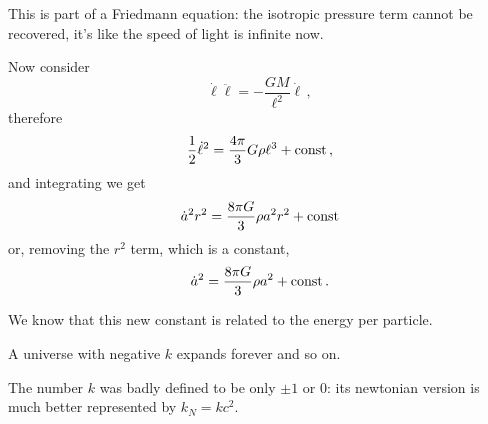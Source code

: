 \documentclass[main.tex]{subfiles}
\begin{document}
This is part of a Friedmann equation: the isotropic pressure term cannot be recovered, it's like the speed of light is infinite now.

Now consider 
\begin{equation}
  \dot{\ell} \ddot{\ell} = - \frac{GM}{\ell^2} \dot{\ell}\,,
\end{equation}
%
therefore 
%
\begin{equation}
  \frac{1}{2}\dot{\ell}^2 = \frac{4 \pi}{3} G \rho \ell^{3} + \text{const}\,,
\end{equation}
%
and integrating we get
%
\begin{equation}
  \dot{a}^2 r^2 = \frac{8 \pi G}{3} \rho a^2 r^2 + \text{const}
\end{equation}
%
or, removing the \(r^2\) term, which is a constant,
%
\begin{equation}
    \dot{a}^2 = \frac{8 \pi G}{3} \rho a^2 + \text{const}\,.
\end{equation}

We know that this new constant is related to the energy per particle. 

A universe with negative \(k\) expands forever and so on.

The number \(k\) was badly defined to be only \(\pm 1\) or 0: its newtonian version is much better represented by \(k_N = kc^2\).
\end{document}
